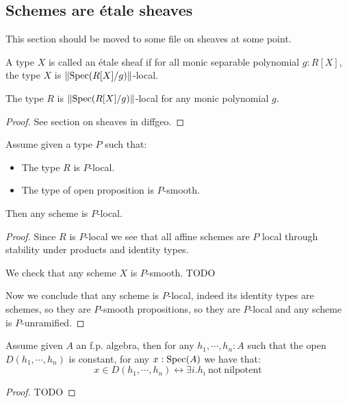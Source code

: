 \subsection{Schemes are étale sheaves}

This section should be moved to some file on sheaves at some point.

\begin{definition}
A type $X$ is called an étale sheaf if for all monic separable polynomial $g:R[X]$, the type $X$ is $\lVert \operatorname{Spec}(R[X]/g) \rVert$-local.
\end{definition}

\begin{lemma}\label{fppf-subcanonical}
The type $R$ is $\lVert \operatorname{Spec}(R[X]/g) \rVert$-local for any monic polynomial $g$. 
\end{lemma}

\begin{proof}
See section on sheaves in diffgeo.
\end{proof}

\begin{lemma}\label{scheme-are-sheaf-from-affine}
Assume given a type $P$ such that:
\begin{itemize}
\item The type $R$ is $P$-local.
\item The type of open proposition is $P$-smooth.
\end{itemize}
Then any scheme is $P$-local.
\end{lemma}

\begin{proof}
Since $R$ is $P$-local we see that all affine schemes are $P$ local through stability under products and identity types. 

We check that any scheme $X$ is $P$-smooth. TODO

Now we conclude that any scheme is $P$-local, indeed its identity types are schemes, so they are $P$-smooth propositions, so they are $P$-local and any scheme is $P$-unramified.
\end{proof}

\begin{lemma}\label{constant-open-affine}
Assume given $A$ an f.p. algebra, then for any $h_1,\cdots,h_n:A$ such that the open $D(h_1,\cdots,h_n)$ is constant, for any $x:\operatorname{Spec}(A)$ we have that:
\[x\in D(h_1,\cdots,h_n) \leftrightarrow \exists i. h_i\ \mathrm{not\ nilpotent}\]
\end{lemma}

\begin{proof}
TODO
\end{proof}

